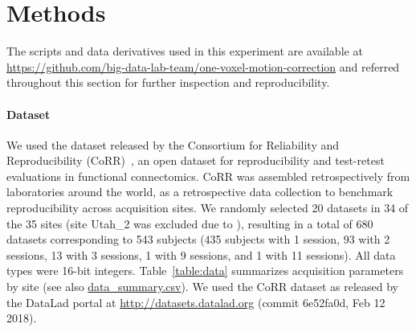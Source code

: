\documentclass[11pt]{IEEEtran}
\begin{document}
 


\section{Methods}

The scripts and data derivatives used in this experiment are available at
\url{https://github.com/big-data-lab-team/one-voxel-motion-correction} and
referred throughout this section for further inspection and
reproducibility.

\paragraph{Dataset}
We used the dataset released by the Consortium for Reliability and
Reproducibility (CoRR)~\cite{zuo2014open}, an open dataset for
reproducibility and test-retest evaluations in functional connectomics.
CoRR was assembled retrospectively from laboratories around the world, as a
retrospective data collection to benchmark reproducibility across
acquisition sites. We randomly selected 20 datasets in 34 of the 35 sites
(site Utah\_2 was excluded due to ), resulting in a total of 680
datasets corresponding to 543 subjects (435 subjects with 1 session, 93
with 2 sessions, 13 with 3 sessions, 1 with 9 sessions, and 1 with 11
sessions). All data types were 16-bit integers. Table~\ref{table:data}
summarizes acquisition parameters by site (see also
\href{https://github.com/big-data-lab-team/one-voxel-motion-correction/data\_summary.csv}{data\_summary.csv}).
We used the CoRR dataset as released by the DataLad portal at
\url{http://datasets.datalad.org} (commit 6e52fa0d, Feb 12 2018).
\end{document}

